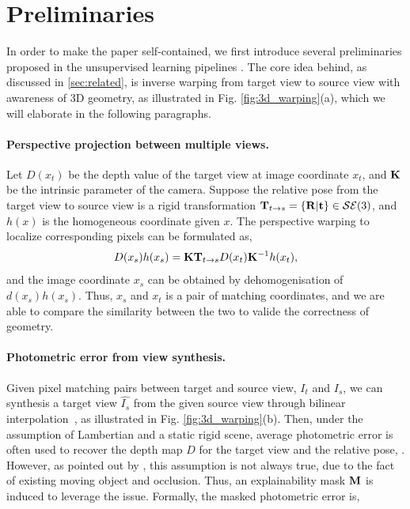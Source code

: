 \section{Preliminaries}
\label{sec:preliminaries}
In order to make the paper self-contained, we first introduce several preliminaries proposed in the unsupervised learning pipelines \cite{zhou2017unsupervised,}. The core idea behind, as discussed in \ref{sec:related}, is inverse warping from target view to source view with awareness of 3D geometry, as illustrated in Fig. \ref{fig:3d_warping}(a), which we will elaborate in the following paragraphs.

\paragraph{Perspective projection between multiple views.}
Let $D(x_t)$ be the depth value of the target view at image coordinate $x_t$, and ${\mathbf K}$ be the intrinsic parameter of the camera. Suppose the relative pose from the target view to source view is a rigid transformation ${\mathbf T}_{t\rightarrow s} = \{{\mathbf R} | {\mathbf t}\} \in {\mathcal S}{\mathcal E}(3)$, and $h(x)$ is the homogeneous coordinate given $x$. The perspective warping to localize corresponding pixels can be formulated as, 
\begin{align}
\label{eqn:warp}
D(x_s)h(x_s) = {\mathbf K}{\mathbf T}_{t\rightarrow s}D(x_t){\mathbf K}^{-1}h(x_t),
\end{align}
and the image coordinate $x_s$ can be obtained by dehomogenisation of $d(x_s)h(x_s)$. Thus, $x_s$ and $x_t$ is a pair of matching coordinates, and we are able to compare the similarity between the two to valide the correctness of geometry.


\paragraph{Photometric error from view synthesis.} 
\label{chap:warping}
Given pixel matching pairs between target and source view, \ie $I_t$ and $I_s$, we can synthesis a target view $\hat{I_s}$ from the given source view through bilinear interpolation~\cite{GargBR16}, as illustrated in Fig. \ref{fig:3d_warping}(b). 
Then, under the assumption of Lambertian and a static rigid scene, average photometric error is often used to recover the depth map $D$ for the target view and the relative pose, \eg \cite{zhou2017unsupervised}. 
However, as pointed out by \cite{zhou2017unsupervised}, this assumption is not always true, due to the fact of existing moving object and occlusion. Thus, an explainability mask ${\mathbf M}$ is induced to leverage the issue. Formally, the masked photometric error is,

